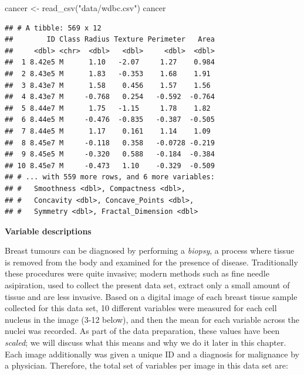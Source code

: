 \documentclass[
]{krantz}
\makeatletter
\newenvironment{Shaded}{\begin{snugshade}}{\end{snugshade}}
\newcommand{\FunctionTok}[1]{\textcolor[rgb]{0,0,0}{#1}}
\newcommand{\NormalTok}[1]{#1}
\newcommand{\OtherTok}[1]{\textcolor[rgb]{0.37,0.37,0.37}{#1}}
\newcommand{\StringTok}[1]{\textcolor[rgb]{0.5,0.5,0.5}{#1}}
\newenvironment{kframe}{%
\medskip{}
\setlength{\fboxsep}{.8em}
 \def\at@end@of@kframe{}%
 \ifinner\ifhmode%
  \def\at@end@of@kframe{\end{minipage}}%
  \begin{minipage}{\columnwidth}%
 \fi\fi%
 \def\FrameCommand##1{\hskip\@totalleftmargin \hskip-\fboxsep
 \colorbox{shadecolor}{##1}\hskip-\fboxsep
     \hskip-\linewidth \hskip-\@totalleftmargin \hskip\columnwidth}%
 \MakeFramed {\advance\hsize-\width
   \@totalleftmargin\z@ \linewidth\hsize
   \@setminipage}}%
 {\par\unskip\endMakeFramed%
 \at@end@of@kframe}
\renewenvironment{Shaded}{\begin{kframe}}{\end{kframe}}
\makeatother
\begin{document}
\begin{Shaded}
\begin{Highlighting}[]
\NormalTok{cancer }\OtherTok{\textless{}{-}} \FunctionTok{read\_csv}\NormalTok{(}\StringTok{"data/wdbc.csv"}\NormalTok{)}
\NormalTok{cancer}
\end{Highlighting}
\end{Shaded}

\begin{verbatim}
## # A tibble: 569 x 12
##        ID Class Radius Texture Perimeter   Area
##     <dbl> <chr>  <dbl>   <dbl>     <dbl>  <dbl>
##  1 8.42e5 M      1.10   -2.07     1.27    0.984
##  2 8.43e5 M      1.83   -0.353    1.68    1.91 
##  3 8.43e7 M      1.58    0.456    1.57    1.56 
##  4 8.43e7 M     -0.768   0.254   -0.592  -0.764
##  5 8.44e7 M      1.75   -1.15     1.78    1.82 
##  6 8.44e5 M     -0.476  -0.835   -0.387  -0.505
##  7 8.44e5 M      1.17    0.161    1.14    1.09 
##  8 8.45e7 M     -0.118   0.358   -0.0728 -0.219
##  9 8.45e5 M     -0.320   0.588   -0.184  -0.384
## 10 8.45e7 M     -0.473   1.10    -0.329  -0.509
## # ... with 559 more rows, and 6 more variables:
## #   Smoothness <dbl>, Compactness <dbl>,
## #   Concavity <dbl>, Concave_Points <dbl>,
## #   Symmetry <dbl>, Fractal_Dimension <dbl>
\end{verbatim}

\textbf{Variable descriptions}

Breast tumours can be diagnosed by performing a \emph{biopsy}, a process where
tissue is removed from the body and examined for the presence of disease.
Traditionally these procedures were quite invasive; modern methods such as fine
needle asipiration, used to collect the present data set, extract only a small
amount of tissue and are less invasive. Based on a digital image of each breast
tissue sample collected for this data set, 10 different variables were measured
for each cell nucleus in the image (3-12 below), and then the mean
for each variable across the nuclei was recorded. As part of the
data preparation, these values have been \emph{scaled}; we will discuss what this
means and why we do it later in this chapter. Each image additionally was given
a unique ID and a diagnosis for malignance by a physician. Therefore, the
total set of variables per image in this data set are:
\end{document}
